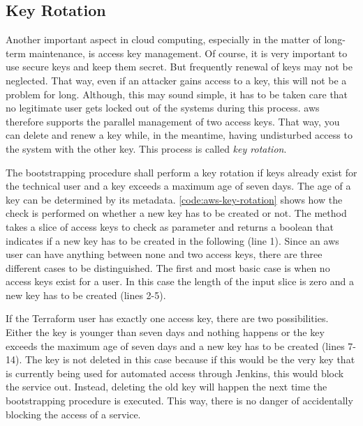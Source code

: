 


\subsection{Key Rotation}
Another important aspect in cloud computing, especially in the matter of long-term maintenance, is access key management.
Of course, it is very important to use secure keys and keep them secret.
But frequently renewal of keys may not be neglected.
That way, even if an attacker gains access to a key, this will not be a problem for long.
Although, this may sound simple, it has to be taken care that no legitimate user gets locked out of the systems during this process.
\ac{aws} therefore supports the parallel management of two access keys.
That way, you can delete and renew a key while, in the meantime, having undisturbed access to the system with the other key.
This process is called \emph{key rotation}.

The bootstrapping procedure shall perform a key rotation if keys already exist for the technical user and a key exceeds a maximum age of seven days.
The age of a key can be determined by its metadata.
\autoref{code:aws-key-rotation} shows how the check is performed on whether a new key has to be created or not.
The method takes a slice of access keys to check as parameter and returns a boolean that indicates if a new key has to be created in the following (line 1).
Since an \ac{aws} user can have anything between none and two access keys, there are three different cases to be distinguished.
The first and most basic case is when no access keys exist for a user.
In this case the length of the input slice is zero and a new key has to be created (lines 2-5).

If the Terraform user has exactly one access key, there are two possibilities.
Either the key is younger than seven days and nothing happens or the key exceeds the maximum age of seven days and a new key has to be created (lines 7-14).
The key is not deleted in this case because if this would be the very key that is currently being used for automated access through Jenkins, this would block the service out.
Instead, deleting the old key will happen the next time the bootstrapping procedure is executed.
This way, there is no danger of accidentally blocking the access of a service.

